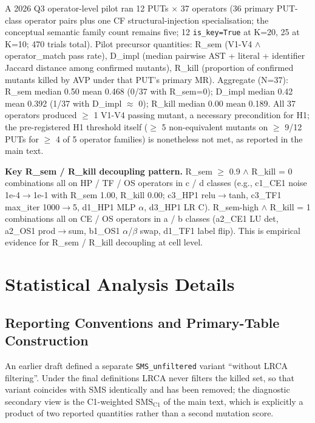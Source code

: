 \documentclass[manuscript,screen,review]{acmart}
\begin{document}
A 2026 Q3 operator-level pilot ran 12 PUTs $\times$ 37 operators (36
primary PUT-class operator pairs plus one CF structural-injection
specialisation; the conceptual semantic family count remains five; 12
\texttt{is\_key=True} at K=20, 25 at K=10; 470 trials total). Pilot
precursor quantities: R\_sem (V1-V4 $\wedge$ operator\_match pass rate),
D\_impl (median pairwise AST + literal + identifier Jaccard distance
among confirmed mutants), R\_kill (proportion of confirmed mutants
killed by AVP under that PUT's primary MR). Aggregate (N=37): R\_sem
median 0.50 mean 0.468 (0/37 with R\_sem=0); D\_impl median 0.42 mean
0.392 (1/37 with D\_impl $\approx$ 0); R\_kill median 0.00 mean 0.189. All 37
operators produced $\geq$ 1 V1-V4 passing mutant, a necessary
precondition for H1; the pre-registered H1 threshold itself ($\geq$ 5
non-equivalent mutants on $\geq$ 9/12 PUTs for $\geq$ 4 of 5 operator
families) is nonetheless not met, as reported in the main text.

\textbf{Key R\_sem / R\_kill decoupling pattern.} R\_sem $\geq$ 0.9 $\wedge$ R\_kill
= 0 combinations all on HP / TF / OS operators in c / d classes (e.g.,
c1\_CE1 noise 1e-4$\to$1e-1 with R\_sem 1.00, R\_kill 0.00; c3\_HP1
relu$\to$tanh, c3\_TF1 max\_iter 1000$\to$5, d1\_HP1 MLP $\alpha$, d3\_HP1 LR C).
R\_sem-high $\wedge$ R\_kill = 1 combinations all on CE / OS operators in a / b
classes (a2\_CE1 LU det, a2\_OS1 prod$\to$sum, b1\_OS1 $\alpha$/$\beta$ swap, d1\_TF1
label flip). This is empirical evidence for R\_sem / R\_kill decoupling at cell level.


\section{Statistical Analysis Details}\label{d.-statistical-analysis-details}

\subsection{Reporting Conventions and Primary-Table Construction}\label{d.1-sms-variants-and-construction-lemmas}

An earlier draft defined a separate \texttt{SMS\_unfiltered} variant
``without LRCA filtering''. Under the final definitions LRCA never
filters the killed set, so that variant coincides with SMS identically
and has been removed; the diagnostic secondary view is the C1-weighted
$\mathrm{SMS}_{\mathrm{C1}}$ of the main text, which is explicitly a
product of two reported quantities rather than a second mutation score.
\end{document}
